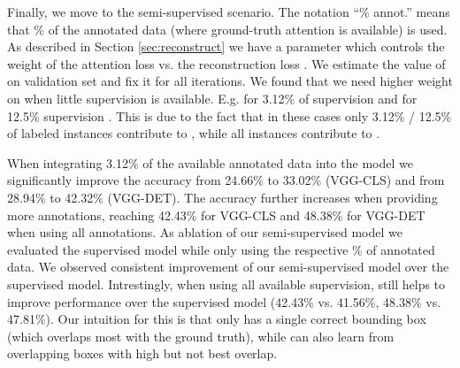 Finally, we move to the semi-supervised scenario. The notation ``\% annot.'' means that \% of the annotated data (where ground-truth attention is available) is used. As described in Section \ref{sec:reconstruct} we have a parameter  which controls the weight of the attention loss  vs. the reconstruction loss . We estimate the value of  on validation set and fix it for all iterations. We found that we need higher weight on  when little supervision is available. E.g. for 3.12\% of supervision  and for 12.5\% supervision . This is due to the fact that in these cases only 3.12\% / 12.5\% of labeled instances contribute to , while all instances contribute to .

When integrating 3.12\% of the available annotated data into the model we significantly improve the accuracy from 24.66\% to 33.02\% (VGG-CLS) and from 28.94\% to 42.32\% (VGG-DET). The accuracy further increases when providing more annotations,  reaching 42.43\% for VGG-CLS and 48.38\% for VGG-DET when using all annotations.
As ablation of our semi-supervised model we evaluated the supervised model while only using the respective \% of annotated data. We observed consistent improvement of our semi-supervised model over the supervised model. Intrestingly, when using all available supervision,  still helps to improve performance over the  supervised model (42.43\% vs. 41.56\%, 48.38\% vs. 47.81\%). Our intuition for this is that  only has a single correct bounding box (which overlaps most with the ground truth), while  can also learn from overlapping boxes with high but not best overlap.

